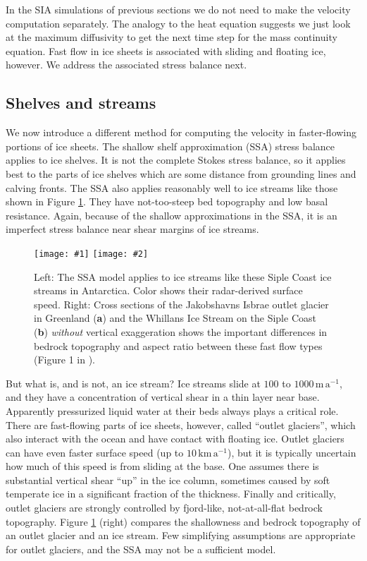\documentclass[titlepage,a4paper,final,12pt]{scrartcl}
\newcommand{\twofigsizes}[5]{
\begin{figure}[ht]
\centering
\texttt{[image: \#1]} \quad
\texttt{[image: \#2]}
\caption{#3}
\label{fig:#1}
\end{figure}}
\begin{document}
In the SIA simulations of previous sections we do not need to make the velocity computation separately.  The analogy to the heat equation suggests we just look at the maximum diffusivity to get the next time step for the mass continuity equation.  Fast flow in ice sheets is associated with sliding and floating ice, however.  We address the associated stress balance next.


\subsection{Shelves and streams} \label{sec:shelvesandstreams}

We now introduce a different method for computing the velocity in faster-flowing portions of ice sheets.  The shallow shelf approximation (SSA) stress balance applies to ice shelves.  It is not the complete Stokes stress balance, so it applies best to the parts of ice shelves which are some distance from grounding lines and calving fronts.  The SSA also applies reasonably well to ice streams like those shown in Figure \ref{fig:siple}.  They have not-too-steep bed topography and low basal resistance.  Again, because of the shallow approximations in the SSA, it is an imperfect stress balance near shear margins of ice streams.

\twofigsizes{siple}{streamisbrae}{Left:  The SSA model applies to ice streams like these Siple Coast ice streams in Antarctica.  Color shows their radar-derived surface speed.  Right: Cross sections of the Jakobshavns Isbrae outlet glacier in Greenland (\textbf{a}) and the Whillans Ice Stream on the Siple Coast (\textbf{b}) \emph{without} vertical exaggeration shows the important differences in bedrock topography and aspect ratio between these fast flow types (Figure 1 in \cite{TrufferEchelmeyer}).}{2.8in}{2.9in}

But what is, and is not, an ice stream?  Ice streams slide at $100$ to $1000 \,\text{m}\,\text{a}^{-1}$, and they have a concentration of vertical shear in a thin layer near base.  Apparently pressurized liquid water at their beds always plays a critical role.  There are fast-flowing parts of ice sheets, however, called ``outlet glaciers'', which also interact with the ocean and have contact with floating ice.  Outlet glaciers can have even faster surface speed (up to $10 \,\text{km}\,\text{a}^{-1}$), but it is typically uncertain how much of this speed is from sliding at the base.  One assumes there is substantial vertical shear ``up'' in the ice column, sometimes caused by soft temperate ice in a significant fraction of the thickness.  Finally and critically, outlet glaciers are strongly controlled by fjord-like, not-at-all-flat bedrock topography.  Figure \ref{fig:siple} (right) compares the shallowness and bedrock topography of an outlet glacier and an ice stream.  Few simplifying assumptions are appropriate for outlet glaciers, and the SSA may not be a sufficient model.
\end{document}
